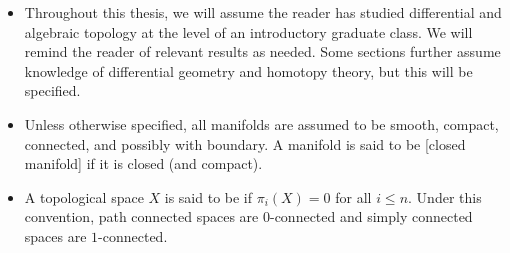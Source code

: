\begin{itemize}
  \item Throughout this thesis, we will assume the reader has studied differential and algebraic topology at the level of an introductory graduate class. We will remind the reader of relevant results as needed. Some sections further assume knowledge of differential geometry and homotopy theory, but this will be specified.
  \item Unless otherwise specified, all manifolds are assumed to be smooth, compact, connected, and possibly with boundary. A manifold is said to be [closed manifold] if it is closed (and compact).
  \item A topological space $X$ is said to be  if $\pi_i(X)=0$ for all $i\leq n$. Under this convention, path connected spaces are $0$-connected and simply connected spaces are $1$-connected.
\end{itemize}
